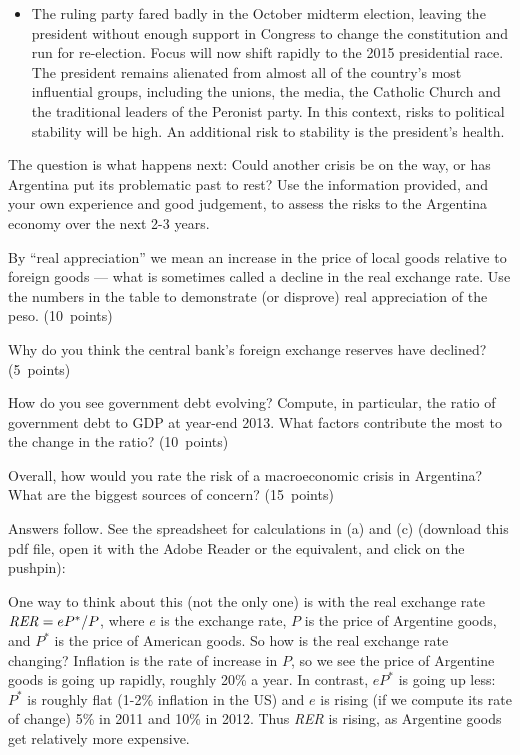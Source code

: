 \documentclass[letterpaper,12pt]{exam}
\begin{document}
\begin{questions}
\begin{itemize}
\item The ruling party fared badly in the October midterm election,
 leaving the president without enough support in Congress
 to change the constitution and run for re-election.
 Focus will now shift rapidly to the 2015 presidential race.
 The president remains alienated from almost all of the country's most influential groups,
including the unions, the media, the Catholic Church and the traditional
leaders of the Peronist party. In this context, risks to political stability will be
high. An additional risk to stability is the president's health.
\end{itemize}
%
The question is what happens next:  Could another crisis be on the way,
or has Argentina put its problematic past to rest?
Use the information provided, and your own experience and good judgement,
to assess the risks to the Argentina economy over the next 2-3 years.
%
\begin{parts}
\item By ``real appreciation'' we mean an increase in the price
of local goods relative to foreign goods ---
what is sometimes called a decline in the real exchange rate.
Use the numbers in the table to demonstrate (or disprove) real appreciation
of the peso.
(10~points)

\item Why do you think the central bank's foreign exchange reserves have declined?
(5~points)

\item How do you see government debt evolving?
Compute, in particular, the ratio of government debt to GDP at year-end 2013.
What factors contribute the most to the change in the ratio?
(10~points)

\item Overall, how would you rate the risk of a macroeconomic crisis in Argentina?
What are the biggest sources of concern?
(15~points)
\end{parts}

\begin{solution}
Answers follow.  
See the spreadsheet for calculations in (a) and (c) 
(download this pdf file, open it with the Adobe Reader or the equivalent,
and click on the pushpin):

\begin{parts}
\item 
One way to think about this (not the only one) is with the real exchange rate 
$ \mbox{\em RER\/} = eP^*/P$, where $e$ is the exchange rate, $P$ is the price of Argentine goods,
and $P^*$ is the price of American goods.  
So how is the real exchange rate changing?  
Inflation is the rate of increase in $P$, so we see the price of Argentine goods
is going up rapidly, roughly 20\% a year.  
In contrast, $eP^*$ is going up less:
$P^*$ is roughly flat (1-2\% inflation in the US)
and $e$ is rising (if we compute its rate of change)
5\% in 2011 and 10\% in 2012.
Thus {\it RER\/} is rising, as Argentine goods get relatively more expensive.  


\end{parts}
\end{solution}
\end{questions}
\end{document}
